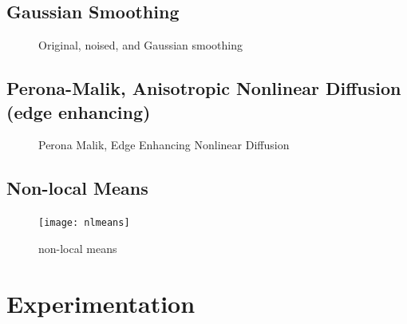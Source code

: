 \subsection{Gaussian Smoothing}
\label{sec:gaussian-smoothing}
\begin{figure}[htb]
\centering
{}
\caption{Original, noised, and Gaussian smoothing}
\end{figure}


\subsection{Perona-Malik, Anisotropic Nonlinear Diffusion (edge enhancing)}
\begin{figure}[htb]
\centering
{}
\caption{Perona Malik, Edge Enhancing Nonlinear Diffusion}
\end{figure}

\subsection{Non-local Means}
\label{sec:non-local-means}
\begin{figure}[htb]
\centering
\texttt{[image: nlmeans]}
\caption{non-local means}
\end{figure}

\section{Experimentation}
\label{sec:experimentation}


\pagebreak
\pagebreak


